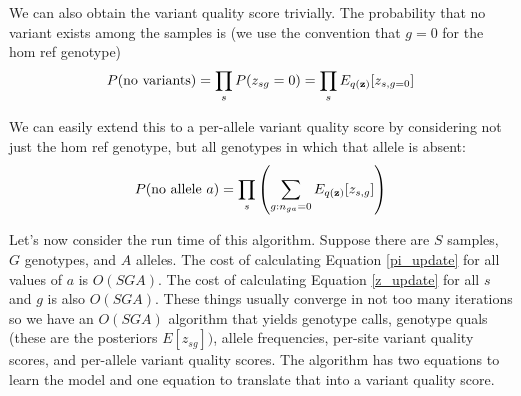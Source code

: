 \documentclass[nofootinbib,amssymb,amsmath]{revtex4}
\newcommand{\vz}{{\bf z}}
\begin{document}
We can also obtain the variant quality score trivially.  The probability that no variant exists among the samples is (we use the convention that $g=0$ for the hom ref genotype)
\begin{equation}
P({\rm no~variants}) = \prod_s P(z_{sg} = 0) = \prod_s E_{q(\vz)}[z_{s, g=0}] 
\end{equation}

We can easily extend this to a per-allele variant quality score by considering not just the hom ref genotype, but all genotypes in which that allele is absent:
\begin{equation}
P({\rm no~allele}~a) = \prod_s \left( \sum_{g : n_{ga} = 0} E_{q(\vz)}[z_{s, g}] \right)
\end{equation}

Let's now consider the run time of this algorithm.  Suppose there are $S$ samples, $G$ genotypes, and $A$ alleles.  The cost of calculating Equation \ref{pi_update} for all values of $a$ is $O(S G A)$.  The cost of calculating Equation \ref{z_update} for all $s$ and $g$ is also $O(S G A)$.  These things usually converge in not too many iterations so we have an $O(S G A)$ algorithm that yields genotype calls, genotype quals (these are the posteriors $E[z_{sg}])$, allele frequencies, per-site variant quality scores, and per-allele variant quality scores.  The algorithm has two equations to learn the model and one equation to translate that into a variant quality score.
\end{document}
